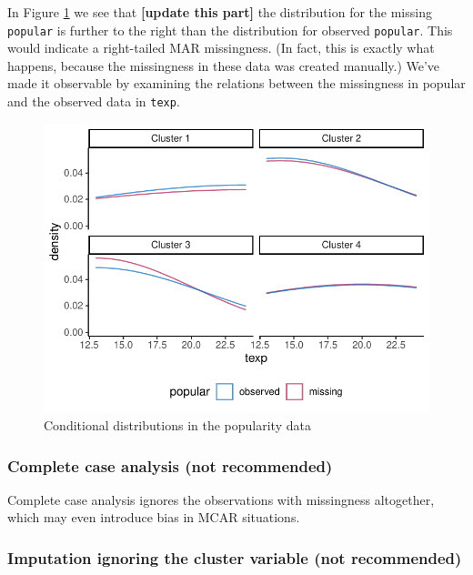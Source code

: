 \documentclass[
]{jss}
\begin{document}
In Figure \ref{fig:pop_dist} we see that \textbf{{[}update this part{]}}
the distribution for the missing \texttt{popular} is further to the
right than the distribution for observed \texttt{popular}. This would
indicate a right-tailed MAR missingness. (In fact, this is exactly what
happens, because the missingness in these data was created manually.)
We've made it observable by examining the relations between the
missingness in popular and the observed data in \texttt{texp}.

\begin{CodeChunk}
\begin{figure}

{\centering \includegraphics{Manuscript_files/figure-latex/pop_dist-1} 

}

\caption[Conditional distributions in the popularity data]{Conditional distributions in the popularity data}\label{fig:pop_dist}
\end{figure}
\end{CodeChunk}

\hypertarget{complete-case-analysis-not-recommended}{%
\subsubsection{Complete case analysis (not
recommended)}\label{complete-case-analysis-not-recommended}}

Complete case analysis ignores the observations with missingness
altogether, which may even introduce bias in MCAR situations.

\hypertarget{imputation-ignoring-the-cluster-variable-not-recommended}{%
\subsubsection{Imputation ignoring the cluster variable (not
recommended)}\label{imputation-ignoring-the-cluster-variable-not-recommended}}
\end{document}
